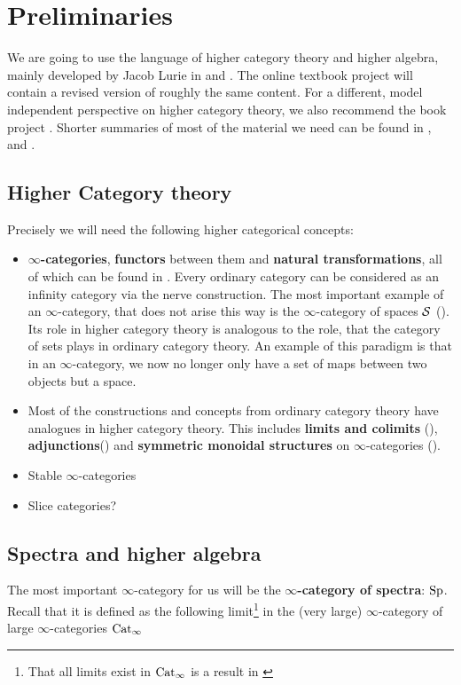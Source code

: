 \chapter{Preliminaries}
We are going to use the language of higher category theory and higher algebra, mainly developed by Jacob Lurie in \cite{HigherToposTheory} and \cite{lurie2017higher}. The online textbook project \cite{kerodon} will contain a revised version of roughly the same content. For a different, model independent perspective on higher category theory, we also recommend the book project \cite{riehl2018elements}. Shorter summaries of most of the material we need can be found in \cite{Grothshortcourse}, \cite{camarena2013whirlwind} and \cite{Gepnerintroductionhigher}.
\section{Higher Category theory}
Precisely we will need the following higher categorical concepts:


\begin{itemize}
    \item \textbf{$\infty$-categories}, \textbf{functors} between them and \textbf{natural transformations}, all of which can be found in \cite[Chapter~1]{HigherToposTheory}. Every ordinary category can be considered as an infinity category via the nerve construction. The most important example of an $\infty$-category, that does not arise this way is the $\infty$-category of spaces $\mathcal{S}$ (\cite[Section~1.2.6]{HigherToposTheory}). Its role in higher category theory is analogous to the role, that the category of sets plays in ordinary category theory. An example of this paradigm is that in an $\infty$-category, we now no longer only have a set of maps between two objects but a space.
    \item Most of the constructions and concepts from ordinary category theory have analogues in higher category theory. This includes \textbf{limits and colimits} (\cite[Section~1.2.3, Chapter~4]{HigherToposTheory}), \textbf{adjunctions}(\cite[\href{https://kerodon.net/tag/02EJ}{Tag 02EJ}]{kerodon}) and \textbf{symmetric monoidal structures} on $\infty$-categories (\cite[Definition~2.0.0.7]{lurie2017higher}).
    \item Stable $\infty$-categories \cite[Section~1.1]{lurie2017higher}
    \item Slice categories?
\end{itemize}
\section{Spectra and higher algebra}
The most important $\infty$-category for us will be the\textbf{ $\infty$-category of spectra}: $\operatorname{Sp}$. Recall that it is defined as the following limit\footnote{That all limits exist in $\operatorname{Cat}_\infty$ is a result in \cite[Section~3.3.3]{HigherToposTheory}} in the (very large) $\infty$-category of large $\infty$-categories $\operatorname{Cat}_\infty$


